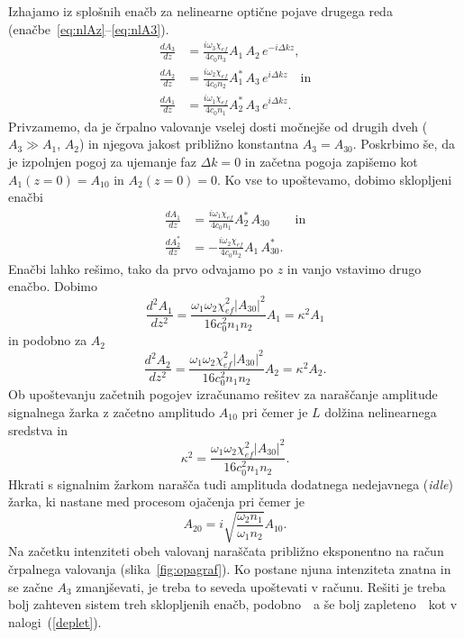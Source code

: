Izhajamo iz splošnih enačb za nelinearne optične pojave drugega reda 
(enačbe~\ref{eq:nlAz}--\ref{eq:nlA3}). 
\begin{align}
\frac{dA_{3}}{dz} &=\frac{i\omega_{3}\chi_{ef}}{4c_0 n_3} A_{1}\, A_{2}\, e^{-i\Delta kz}, \\
\frac{dA_{2}}{dz} &=\frac{i\omega_{2}\chi_{ef}}{4c_0 n_2} A_{1}^*\, A_{3}\, e^{i\Delta kz}\quad \textrm{in}\\
\frac{dA_{1}}{dz} &=\frac{i\omega_{1}\chi_{ef}}{4c_0 n_1} A_{2}^*\, A_{3}\, e^{i\Delta kz}.
\label{eq:opaA}
\end{align}
Privzamemo, da je črpalno valovanje vselej dosti močnejše od drugih dveh
($A_{3}\gg A_{1}$, $A_{2}$) in njegova jakost približno konstantna $A_3 = A_{30}$.
Poskrbimo še, da je izpolnjen pogoj za ujemanje faz $\Delta k=0$ in
začetna pogoja zapišemo kot $A_{1}(z=0)=A_{10}$ in $A_{2}(z=0)=0$. Ko vse to upoštevamo,
dobimo sklopljeni enačbi
\begin{align}
\frac{dA_{1}}{dz} &= \frac{i\omega_{1}\chi_{ef}}{4c_0 n_1} A_{2}^*\, A_{30}\label{eq:opaA1} 
\qquad \mathrm{in} \\
\frac{dA_{2}^*}{dz} &= -\frac{i\omega_{2}\chi_{ef}}{4c_0 n_2} A_{1}\, A_{30}^*.
\label{eq:opaA2}
\end{align}
Enačbi lahko rešimo, tako da prvo odvajamo po $z$ in vanjo vstavimo drugo enačbo.
Dobimo
\begin{equation}
\frac{d^2 A_1}{d z^2} = \frac{\omega_1 \omega_2 \chi_{ef}^2|A_{30}|^2}
{16 c_0^2 n_1 n_2} A_1 = \kappa^2 A_1
\end{equation}
in podobno za $A_2$
\begin{equation}
\frac{d^2 A_2}{d z^2} = \frac{\omega_1 \omega_2 \chi_{ef}^2|A_{30}|^2}
{16 c_0^2 n_1 n_2} A_2 = \kappa^2 A_2.
\end{equation}
Ob upoštevanju začetnih pogojev izračunamo rešitev za naraščanje amplitude signalnega žarka
z začetno amplitudo $A_{10}$
pri čemer je $L$ dolžina nelinearnega sredstva in 
\begin{equation}
\kappa^2 = \frac{\omega_1 \omega_2 \chi_{ef}^2|A_{30}|^2}
{16 c_0^2 n_1 n_2}.
\label{opakapa}
\end{equation}
Hkrati s signalnim žarkom narašča tudi amplituda dodatnega nedejavnega 
({\it idle}) žarka, ki nastane med procesom ojačenja
pri čemer je 
\begin{equation}
A_{20} = i \sqrt{\frac{\omega_2 n_1}{\omega_1 n_2}} A_{10}.
\label{opakapaA}
\end{equation}
Na začetku intenziteti obeh valovanj naraščata približno eksponentno na račun črpalnega
valovanja (slika~\ref{fig:opagraf}). Ko postane njuna intenziteta znatna in se 
začne $A_3$ zmanjševati, je treba to seveda
upoštevati v računu. Rešiti je treba bolj zahteven sistem treh 
sklopljenih enačb, podobno~\textendash~a še bolj zapleteno~\textendash~kot v nalogi~(\ref{deplet}).

